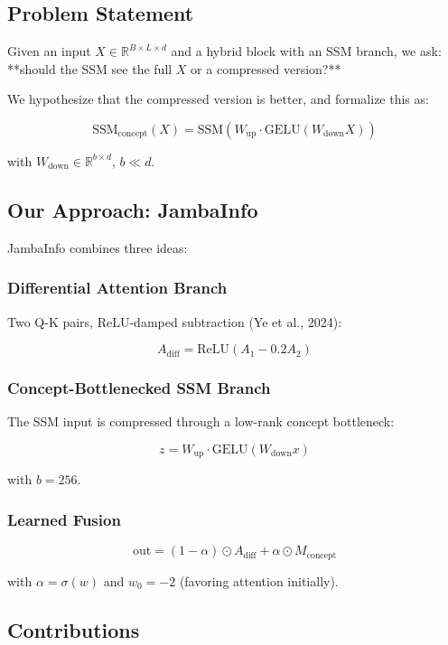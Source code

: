 \subsection{Problem Statement}

Given an input $X \in \mathbb{R}^{B \times L \times d}$ and a hybrid block 
with an SSM branch, we ask: **should the SSM see the full $X$ or a 
compressed version?**

We hypothesize that the compressed version is better, and formalize this as:

\[
\text{SSM}_\text{concept}(X) = \text{SSM}\!\left(W_\text{up} \cdot \text{GELU}(W_\text{down} X)\right)
\tag{1.1}
\]

with $W_\text{down} \in \mathbb{R}^{b \times d}$, $b \ll d$.

\subsection{Our Approach: JambaInfo}

JambaInfo combines three ideas:

\subsubsection{Differential Attention Branch}

Two Q-K pairs, ReLU-damped subtraction (Ye et al., 2024):

\[
A_\text{diff} = \text{ReLU}(A_1 - 0.2 A_2)
\tag{1.2}
\]

\subsubsection{Concept-Bottlenecked SSM Branch}

The SSM input is compressed through a low-rank concept bottleneck:

\[
z = W_\text{up} \cdot \text{GELU}(W_\text{down} x)
\tag{1.3}
\]

with $b = 256$.

\subsubsection{Learned Fusion}

\[
\text{out} = (1 - \alpha) \odot A_\text{diff} + \alpha \odot M_\text{concept}
\tag{1.4}
\]

with $\alpha = \sigma(w)$ and $w_0 = -2$ (favoring attention initially).

\subsection{Contributions}

